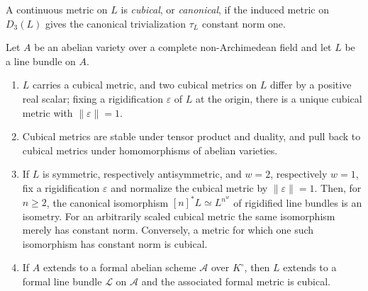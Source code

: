 \begin{definition}
\label{def:ch19-cubical}
A continuous metric on $L$ is \emph{cubical}, or \emph{canonical}, if the
induced metric on $D_3(L)$ gives the canonical trivialization
$\tau_L$ constant norm one.
\end{definition}

\begin{theorem}
\label{thm:ch19-cubical-exists}
Let $A$ be an abelian variety over a complete non-Archimedean field and
let $L$ be a line bundle on $A$.
\begin{enumerate}
\item\label{itm:ch19-cub:exist} $L$ carries a cubical metric, and two
 cubical metrics on $L$ differ by a positive real scalar; fixing a
 rigidification $\varepsilon$ of $L$ at the origin, there is a unique
 cubical metric with $\|\varepsilon\|=1$.
\item\label{itm:ch19-cub:tensor} Cubical metrics are stable under tensor
 product and duality, and pull back to cubical metrics under homomorphisms
 of abelian varieties.
\item\label{itm:ch19-cub:isom} If $L$ is symmetric, respectively
 antisymmetric, and $w=2$, respectively $w=1$, fix a rigidification
 $\varepsilon$ and normalize the cubical metric by
 $\|\varepsilon\|=1$.  Then, for $n\geq2$, the canonical isomorphism
 $[n]^*L\simeq L^{n^w}$ of rigidified line bundles is an isometry.  For
 an arbitrarily scaled cubical metric the same isomorphism merely has
 constant norm.  Conversely, a metric for which one such isomorphism has
 constant norm is cubical.
\item\label{itm:ch19-cub:goodred} If $A$ extends to a formal abelian
 scheme $\mathcal A$ over $K^\circ$, then $L$ extends to a formal line
 bundle $\mathcal L$ on $\mathcal A$ and the associated formal metric is
 cubical.
\end{enumerate}
\end{theorem}


